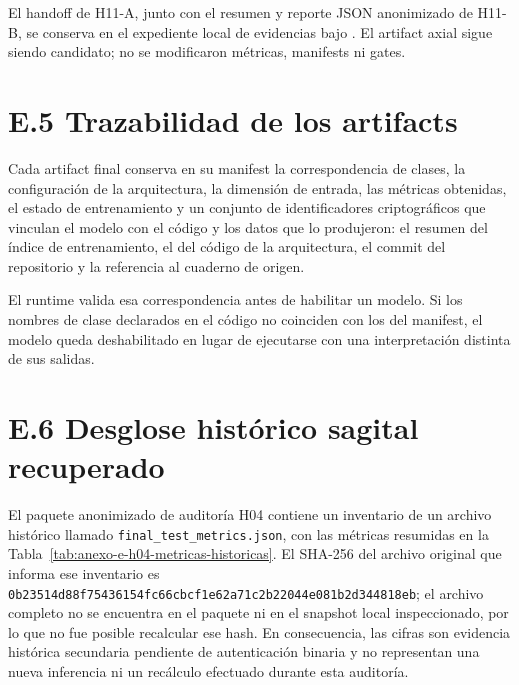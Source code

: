 El handoff de H11-A, junto con el resumen y reporte JSON anonimizado de H11-B, se conserva en el expediente local de evidencias bajo . El artifact axial sigue siendo candidato; no se modificaron métricas, manifests ni gates.
\section*{E.5 Trazabilidad de los artifacts}
\label{anexo:entrenamiento-f4-trazabilidad-artifacts}

Cada artifact final conserva en su manifest la correspondencia de clases, la configuración de la arquitectura, la dimensión de entrada, las métricas obtenidas, el estado de entrenamiento y un conjunto de identificadores criptográficos que vinculan el modelo con el código y los datos que lo produjeron: el resumen del índice de entrenamiento, el del código de la arquitectura, el commit del repositorio y la referencia al cuaderno de origen.

El runtime valida esa correspondencia antes de habilitar un modelo. Si los nombres de clase declarados en el código no coinciden con los del manifest, el modelo queda deshabilitado en lugar de ejecutarse con una interpretación distinta de sus salidas.

\section*{E.6 Desglose histórico sagital recuperado}
\label{anexo:entrenamiento-e6-h04-historico}

El paquete anonimizado de auditoría H04 contiene un inventario de un archivo histórico llamado \texttt{final\_test\_metrics.json}, con las métricas resumidas en la Tabla~\ref{tab:anexo-e-h04-metricas-historicas}. El SHA-256 del archivo original que informa ese inventario es \texttt{0b23514d\allowbreak 88f75436\allowbreak 154fc66c\allowbreak bcf1e62a\allowbreak 71c2b220\allowbreak 44e081b2\allowbreak d344818eb}; el archivo completo no se encuentra en el paquete ni en el snapshot local inspeccionado, por lo que no fue posible recalcular ese hash. En consecuencia, las cifras son evidencia histórica secundaria pendiente de autenticación binaria y no representan una nueva inferencia ni un recálculo efectuado durante esta auditoría.

